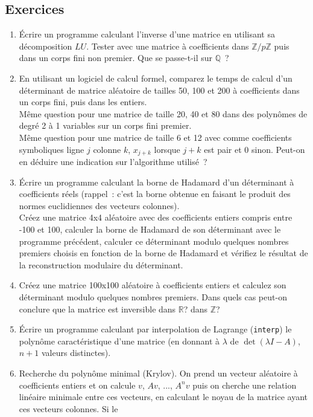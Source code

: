 \documentclass[a4paper,11pt]{book}
\begin{document}
\begin{giacjshere}
\subsection{Exercices}
\begin{enumerate}
\item \'Ecrire un programme calculant l'inverse d'une matrice
en utilisant sa d\'ecomposition $LU$. Tester avec une matrice
\`a coefficients dans $\mathbb{Z}/p\mathbb{Z}$ puis dans un corps fini non premier.
Que se passe-t-il sur $\mathbb{Q}$~?
\item En utilisant un logiciel de calcul formel,
comparez le temps de calcul d'un d\'eterminant de matrice
al\'eatoire de tailles 50, 100 et 200 \`a coefficients dans
un corps fini, puis dans les entiers. \\
M\^eme
question pour une matrice de taille 20, 40 et 80
dans des polyn\^omes de degr\'e 2
\`a 1 variables sur un corps fini premier.\\
M\^eme question pour 
une matrice de taille 6 et 12 avec comme coefficients symboliques
ligne $j$ colonne $k$, $x_{j+k}$ lorsque $j+k$ est pair
et 0 sinon. Peut-on en déduire une indication sur l'algorithme
utilisé~?
\item \'Ecrire un programme calculant la borne de Hadamard d'un
déterminant à coefficients réels (rappel~: c'est la borne obtenue en faisant
le produit des normes euclidiennes des vecteurs colonnes).\\
Créez une matrice 4x4 aléatoire avec des coefficients entiers
compris entre -100 et 100, calculer la borne de Hadamard de son déterminant
avec le programme précédent, calculer ce déterminant modulo
quelques nombres premiers choisis en fonction de la borne de Hadamard
et vérifiez le résultat de la reconstruction modulaire du déterminant.
\item Créez une matrice 100x100 aléatoire à coefficients entiers
et calculez son déterminant
modulo quelques nombres premiers. Dans quels cas peut-on
conclure que la matrice est inversible dans $\mathbb{R}$? dans $\mathbb{Z}$?
\item \'Ecrire un programme calculant par interpolation de Lagrange 
(\verb|interp|)
le polyn\^ome caract\'eristique d'une matrice (en donnant \`a $\lambda$
de $\det(\lambda I -A)$, $n+1$ valeurs distinctes).
\item Recherche du polynôme minimal (Krylov). On prend un vecteur aléatoire
à coefficients entiers et on calcule $v$, $Av$, ..., $A^nv$ puis
on cherche une relation linéaire minimale entre ces vecteurs, en
calculant le noyau de la matrice ayant ces vecteurs colonnes. Si le

\end{enumerate}
\end{giacjshere}
\end{document}
